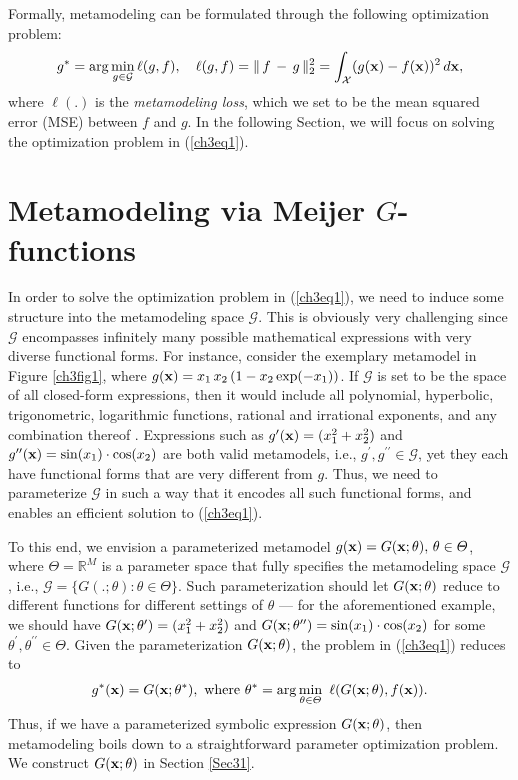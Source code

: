 \documentclass [PhD] {uclathes}
\begin{document}
Formally, metamodeling can be formulated through the following optimization problem:  
\begin{align}
g^* = \arg \min_{g \in \mathcal{G}} \ell(g, f),\,\,\,\,\,\, \ell(g, f) = \|\,f\, - \,g\,\|_2^2 = \int_{\mathcal{X}} (g({\bf x}) - f({\bf x}))^2\, d{\bf x},
\label{ch3eq1}
\end{align}
where $\ell(.)$ is the {\it metamodeling loss}, which we set to be the mean squared error (MSE) between $f$ and $g$. In the following Section, we will focus on solving the optimization problem in (\ref{ch3eq1}).

\section{Metamodeling via Meijer $G$-functions}
\label{ch3sec3}
In order to solve the optimization problem in (\ref{ch3eq1}), we need to induce some structure into the metamodeling space $\mathcal{G}$. This is obviously very challenging since $\mathcal{G}$ encompasses infinitely many possible mathematical expressions with very diverse functional forms. For instance, consider the exemplary metamodel in Figure \ref{ch3fig1}, where $g({\bf x}) = x_1\,x_2\,(1-x_2\exp(-x_1))$. If $\mathcal{G}$ is set to be the space of all closed-form expressions, then it would include all polynomial, hyperbolic, trigonometric, logarithmic functions, rational and irrational exponents, and any combination thereof \cite{chow1999closed,borwein2013closed}. Expressions such as $g^{\prime}({\bf x}) = (x^2_1 + x^2_2)$ and $g^{\prime\prime}({\bf x}) = \sin(x_1)\cdot \cos(x_2)$ are both valid metamodels, i.e., $g^{\prime}, g^{\prime\prime} \in \mathcal{G}$, yet they each have functional forms that are very different from $g$. Thus, we need to parameterize $\mathcal{G}$ in such a way that it encodes all such functional forms, and enables an efficient solution to (\ref{ch3eq1}). 

To this end, we envision a parameterized metamodel $g({\bf x}) = G({\bf x};\theta),\, \theta \in \Theta$, where $\Theta = \mathbb{R}^M$ is a parameter space that fully specifies the metamodeling space $\mathcal{G}$, i.e., $\mathcal{G} = \{G(.;\theta): \theta \in \Theta\}$. Such parameterization should let $G({\bf x};\theta)$ reduce to different functions for different settings of $\theta$ --- for the aforementioned example, we should have $G({\bf x};\theta^{\prime}) = (x^2_1 + x^2_2)$ and $G({\bf x};\theta^{\prime\prime}) = \sin(x_1)\cdot \cos(x_2)$ for some $\theta^{\prime}, \theta^{\prime\prime} \in \Theta$. Given the parameterization $G({\bf x};\theta)$, the problem in (\ref{ch3eq1}) reduces to  
\begin{align}
g^*({\bf x}) = G({\bf x};\theta^*),\,\,\mbox{where}\,\, \theta^* = \arg \min_{\theta \in \Theta}\,\, \ell(G({\bf x};\theta), f({\bf x})).
\label{eq0x3}
\end{align}
Thus, if we have a parameterized symbolic expression $G({\bf x};\theta)$, then metamodeling boils down to a straightforward parameter optimization problem. We construct $G({\bf x};\theta)$ in Section \ref{Sec31}.
\end{document}
